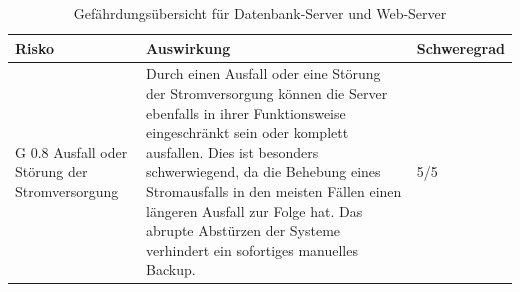 \documentclass[a4paper,
    11pt,
    headings=small,
    ngerman,
    listof=totoc,
    numbers=noenddot]{scrreprt}[2021/11/13]
\begin{document}
\begin{longtable}{p{}p{}l}
  \caption{Gefährdungsübersicht für Datenbank-Server und Web-Server}                                                                                                                                                                                                                                                                                                                                                                                                                                                                                                                                                                                                                                                                                                                                                                                                                                \\
  Risko                                                                                                                                                                                                           & Auswirkung                                                                                                                                                                                                                                                                                                                                                                                                                                                                                                                                                                                                                                                        & Schweregrad \\
  \hline
  G 0.8 Ausfall oder Störung der Stromversorgung                                                                                                                                                                  & Durch einen Ausfall oder eine Störung der Stromversorgung können die Server ebenfalls in ihrer Funktionsweise eingeschränkt sein oder komplett ausfallen.
  Dies ist besonders schwerwiegend, da die Behebung eines Stromausfalls in den meisten Fällen einen längeren Ausfall zur Folge hat. Das abrupte Abstürzen der Systeme verhindert ein sofortiges manuelles Backup. & 5/5                                                                                                                                                                                                                                                                                                                                                                                                                                                                                                                                                                                                                                                                             \\

\end{longtable}
\end{document}

